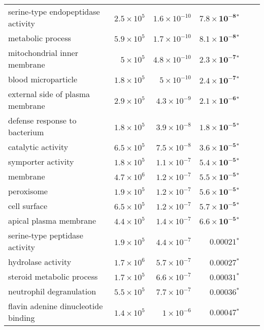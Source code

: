 \begin{longtable}{|l|r|r|r|r|r|}
       serine-type endopeptidase activity & $2.5\times 10^{5}$ & $1.6\times 10^{-10}$ &   $\bm{7.8\times 10^{-8}{^*}}$ \\
                        metabolic process & $5.9\times 10^{5}$ & $1.7\times 10^{-10}$ &   $\bm{8.1\times 10^{-8}{^*}}$ \\
             mitochondrial inner membrane &  $ 5\times 10^{5}$ & $4.8\times 10^{-10}$ &   $\bm{2.3\times 10^{-7}{^*}}$ \\
                      blood microparticle & $1.8\times 10^{5}$ &  $ 5\times 10^{-10}$ &   $\bm{2.4\times 10^{-7}{^*}}$ \\
         external side of plasma membrane & $2.9\times 10^{5}$ &  $4.3\times 10^{-9}$ &   $\bm{2.1\times 10^{-6}{^*}}$ \\
            defense response to bacterium & $1.8\times 10^{5}$ &  $3.9\times 10^{-8}$ &   $\bm{1.8\times 10^{-5}{^*}}$ \\
                       catalytic activity & $6.5\times 10^{5}$ &  $7.5\times 10^{-8}$ &   $\bm{3.6\times 10^{-5}{^*}}$ \\
                       symporter activity & $1.8\times 10^{5}$ &  $1.1\times 10^{-7}$ &   $\bm{5.4\times 10^{-5}{^*}}$ \\
                                 membrane & $4.7\times 10^{6}$ &  $1.2\times 10^{-7}$ &   $\bm{5.5\times 10^{-5}{^*}}$ \\
                               peroxisome & $1.9\times 10^{5}$ &  $1.2\times 10^{-7}$ &   $\bm{5.6\times 10^{-5}{^*}}$ \\
                             cell surface & $6.5\times 10^{5}$ &  $1.2\times 10^{-7}$ &   $\bm{5.7\times 10^{-5}{^*}}$ \\
                   apical plasma membrane & $4.4\times 10^{5}$ &  $1.4\times 10^{-7}$ &   $\bm{6.6\times 10^{-5}{^*}}$ \\
           serine-type peptidase activity & $1.9\times 10^{5}$ &  $4.4\times 10^{-7}$ &             $\bm{0.00021{^*}}$ \\
                       hydrolase activity & $1.7\times 10^{6}$ &  $5.7\times 10^{-7}$ &             $\bm{0.00027{^*}}$ \\
                steroid metabolic process & $1.7\times 10^{5}$ &  $6.6\times 10^{-7}$ &             $\bm{0.00031{^*}}$ \\
                 neutrophil degranulation & $5.5\times 10^{5}$ &  $7.7\times 10^{-7}$ &             $\bm{0.00036{^*}}$ \\
      flavin adenine dinucleotide binding & $1.4\times 10^{5}$ &   $ 1\times 10^{-6}$ &             $\bm{0.00047{^*}}$ \\

\end{longtable}
